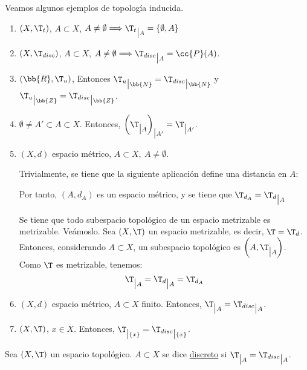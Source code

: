 \begin{ejemplo}
    Veamos algunos ejemplos de topología inducida.
    \begin{enumerate}
        \item $(X,\T_t)$, $A\subset X$, $A\neq \emptyset\Longrightarrow {\T_t}_{\big|A}=\{\emptyset,A\}$

        \item $(X,\T_{disc})$, $A\subset X$, $A\neq\emptyset \Longrightarrow {\T_{disc}}_{\big|A}=\cc{P}(A)$.

        \item $(\bb{R},\T_u)$, Entonces ${\T_u}_{\big|\bb{N}}={\T_{disc}}_{\big|\bb{N}}$ y ${\T_u}_{\big|\bb{Z}}={\T_{disc}}_{\big|\bb{Z}}$.

        \item $\emptyset\neq A'\subset A\subset X$. Entonces, $\left(\T_{\big|A}\right)_{\big|A'}=\T_{\big|A'}$.

        \item $(X,d)$ espacio métrico, $A\subset X,~A\neq \emptyset$. 
        
        Trivialmente, se tiene que la siguiente aplicación define una distancia en $A$:

        Por tanto, $(A,d_A)$ es un espacio métrico, y se tiene que $\T_{d_A}={\T_d}_{\big|A}$

        Se tiene que todo subespacio topológico de un espacio metrizable es metrizable. Veámoslo. Sea $(X,\T)$ un espacio metrizable, es decir, $\T=\T_d$. Entonces, considerando $A\subset X$, un subespacio topológico es $\left(A,\T_{\big| A}\right)$. Como $\T$ es metrizable, tenemos:
        \begin{equation*}
            \T_{\big| A} = {\T_d}_{\big| A} = \T_{d_A}
        \end{equation*}

        \item $(X,d)$ espacio métrico, $A\subset X$ finito. Entonces, $\T_{\big|A}={\T_{disc}}_{\big|A}$.

        \item $(X,\T)$, $x\in X$. Entonces, $\T_{\big| \{x\}}={\T_{disc}}_{\big| \{x\}}$.
    \end{enumerate}
\end{ejemplo}


\begin{definicion}
    Sea $(X,\T)$ un espacio topológico. $A\subset X$ se dice \ul{discreto} si $\T_{\big|A}={\T_{disc}}_{\big|A}$.
\end{definicion}

